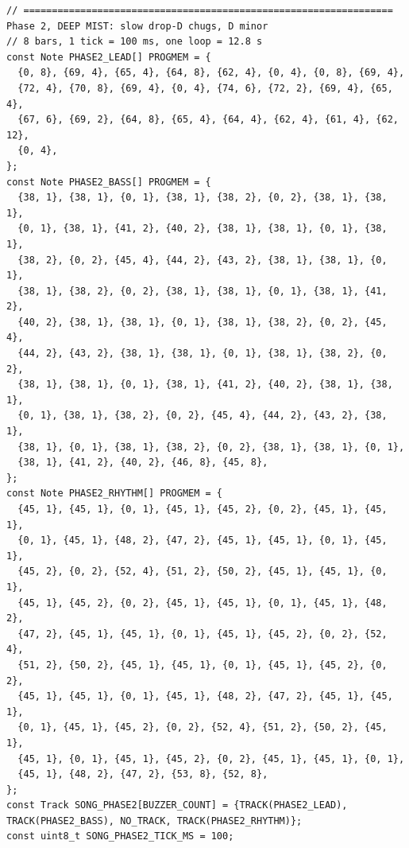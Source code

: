 \documentclass[11pt,a4paper]{article}
\begin{document}
\begin{latin}
\begin{lstlisting}[language=Arduino]
// ================================================================= Phase 2, DEEP MIST: slow drop-D chugs, D minor
// 8 bars, 1 tick = 100 ms, one loop = 12.8 s
const Note PHASE2_LEAD[] PROGMEM = {
  {0, 8}, {69, 4}, {65, 4}, {64, 8}, {62, 4}, {0, 4}, {0, 8}, {69, 4},
  {72, 4}, {70, 8}, {69, 4}, {0, 4}, {74, 6}, {72, 2}, {69, 4}, {65, 4},
  {67, 6}, {69, 2}, {64, 8}, {65, 4}, {64, 4}, {62, 4}, {61, 4}, {62, 12},
  {0, 4},
};
const Note PHASE2_BASS[] PROGMEM = {
  {38, 1}, {38, 1}, {0, 1}, {38, 1}, {38, 2}, {0, 2}, {38, 1}, {38, 1},
  {0, 1}, {38, 1}, {41, 2}, {40, 2}, {38, 1}, {38, 1}, {0, 1}, {38, 1},
  {38, 2}, {0, 2}, {45, 4}, {44, 2}, {43, 2}, {38, 1}, {38, 1}, {0, 1},
  {38, 1}, {38, 2}, {0, 2}, {38, 1}, {38, 1}, {0, 1}, {38, 1}, {41, 2},
  {40, 2}, {38, 1}, {38, 1}, {0, 1}, {38, 1}, {38, 2}, {0, 2}, {45, 4},
  {44, 2}, {43, 2}, {38, 1}, {38, 1}, {0, 1}, {38, 1}, {38, 2}, {0, 2},
  {38, 1}, {38, 1}, {0, 1}, {38, 1}, {41, 2}, {40, 2}, {38, 1}, {38, 1},
  {0, 1}, {38, 1}, {38, 2}, {0, 2}, {45, 4}, {44, 2}, {43, 2}, {38, 1},
  {38, 1}, {0, 1}, {38, 1}, {38, 2}, {0, 2}, {38, 1}, {38, 1}, {0, 1},
  {38, 1}, {41, 2}, {40, 2}, {46, 8}, {45, 8},
};
const Note PHASE2_RHYTHM[] PROGMEM = {
  {45, 1}, {45, 1}, {0, 1}, {45, 1}, {45, 2}, {0, 2}, {45, 1}, {45, 1},
  {0, 1}, {45, 1}, {48, 2}, {47, 2}, {45, 1}, {45, 1}, {0, 1}, {45, 1},
  {45, 2}, {0, 2}, {52, 4}, {51, 2}, {50, 2}, {45, 1}, {45, 1}, {0, 1},
  {45, 1}, {45, 2}, {0, 2}, {45, 1}, {45, 1}, {0, 1}, {45, 1}, {48, 2},
  {47, 2}, {45, 1}, {45, 1}, {0, 1}, {45, 1}, {45, 2}, {0, 2}, {52, 4},
  {51, 2}, {50, 2}, {45, 1}, {45, 1}, {0, 1}, {45, 1}, {45, 2}, {0, 2},
  {45, 1}, {45, 1}, {0, 1}, {45, 1}, {48, 2}, {47, 2}, {45, 1}, {45, 1},
  {0, 1}, {45, 1}, {45, 2}, {0, 2}, {52, 4}, {51, 2}, {50, 2}, {45, 1},
  {45, 1}, {0, 1}, {45, 1}, {45, 2}, {0, 2}, {45, 1}, {45, 1}, {0, 1},
  {45, 1}, {48, 2}, {47, 2}, {53, 8}, {52, 8},
};
const Track SONG_PHASE2[BUZZER_COUNT] = {TRACK(PHASE2_LEAD), TRACK(PHASE2_BASS), NO_TRACK, TRACK(PHASE2_RHYTHM)};
const uint8_t SONG_PHASE2_TICK_MS = 100;


\end{lstlisting}
\end{latin}
\end{document}
